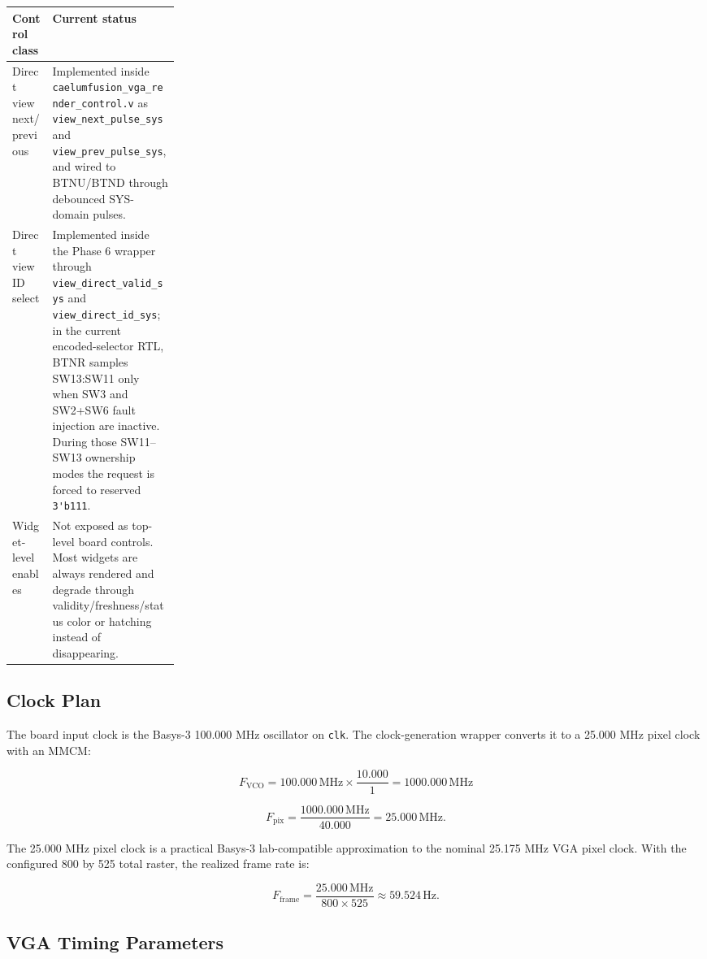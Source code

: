 \documentclass{article}
\newcommand{\sig}[1]{\begingroup\nolinkurl{#1}\endgroup}
\newcommand{\file}[1]{\begingroup\nolinkurl{#1}\endgroup}
\begin{document}
\begin{center}
\begin{tabularx}{\linewidth}{p{0.24\linewidth} X}
\toprule
\textbf{Control class} & \textbf{Current status} \\
\midrule
Direct view next/previous & Implemented inside
\file{caelumfusion_vga_render_control.v} as \sig{view_next_pulse_sys} and
\sig{view_prev_pulse_sys}, and wired to BTNU/BTND through debounced SYS-domain
pulses. \\
Direct view ID select & Implemented inside the Phase 6 wrapper through
\sig{view_direct_valid_sys} and \sig{view_direct_id_sys}; in the current
encoded-selector RTL, BTNR samples SW13:SW11 only when SW3 and SW2+SW6 fault
injection are inactive.  During those SW11--SW13 ownership modes the request is
forced to reserved \sig{3'b111}. \\
Widget-level enables & Not exposed as top-level board controls.  Most widgets
are always rendered and degrade through validity/freshness/status color or
hatching instead of disappearing. \\
\bottomrule
\end{tabularx}
\end{center}

\subsection{Clock Plan}

The board input clock is the Basys-3 100.000 MHz oscillator on \sig{clk}.  The
clock-generation wrapper converts it to a 25.000 MHz pixel clock with an MMCM:

\[
  F_{\mathrm{VCO}}
  = 100.000\,\mathrm{MHz} \times \frac{10.000}{1}
  = 1000.000\,\mathrm{MHz}
\]

\[
  F_{\mathrm{pix}}
  = \frac{1000.000\,\mathrm{MHz}}{40.000}
  = 25.000\,\mathrm{MHz}.
\]

The 25.000 MHz pixel clock is a practical Basys-3 lab-compatible approximation
to the nominal 25.175 MHz VGA pixel clock.  With the configured 800 by 525
total raster, the realized frame rate is:

\[
  F_{\mathrm{frame}}
  = \frac{25.000\,\mathrm{MHz}}{800 \times 525}
  \approx 59.524\,\mathrm{Hz}.
\]

\subsection{VGA Timing Parameters}
\end{document}
